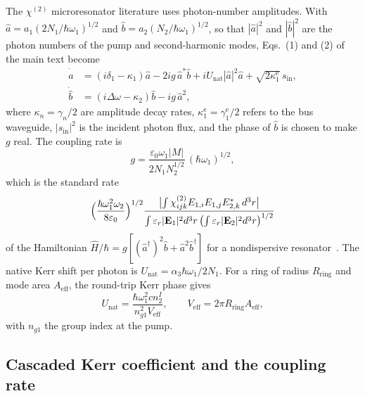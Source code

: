 \documentclass[9pt]{osa-supplemental-document}
\newcommand{\chitwo}{\chi^{(2)}}
\newcommand{\Dom}{\Delta\omega}
\begin{document}
The $\chitwo$ microresonator literature uses photon-number amplitudes.
With $\hat a=a_1(2N_1/\hbar\omega_1)^{1/2}$ and
$\hat b=a_2(N_2/\hbar\omega_1)^{1/2}$, so that $|\hat a|^2$ and
$|\hat b|^2$ are the photon numbers of the pump and second-harmonic modes,
Eqs.~(1) and (2) of the main text become
\begin{align}
  \dot{\hat a}&=(i\delta_1-\kappa_1)\hat a-2ig\,\hat a^*\hat b+iU_{\mathrm{nat}}|\hat a|^2\hat a+\sqrt{2\kappa_1^{\mathrm e}}\,s_{\mathrm{in}},
  \label{eq:ring-a}\\
  \dot{\hat b}&=(i\Dom-\kappa_2)\hat b-ig\,\hat a^2 ,
  \label{eq:ring-b}
\end{align}
where $\kappa_n=\gamma_n/2$ are amplitude decay rates, $\kappa_1^{\mathrm e}=\gamma_1^{\mathrm e}/2$
refers to the bus waveguide, $|s_{\mathrm{in}}|^2$ is the
incident photon flux, and the phase of $\hat b$ is chosen to make $g$ real.
The coupling rate is
\begin{equation}
  g=\frac{\varepsilon_0\omega_1|M|}{2N_1N_2^{1/2}}\,(\hbar\omega_1)^{1/2},
  \label{eq:g}
\end{equation}
which is the standard rate
\begin{equation*}
  \Bigl(\frac{\hbar\omega_1^2\omega_2}{8\varepsilon_0}\Bigr)^{1/2}
  \frac{\bigl|\int\chitwo_{ijk}E_{1,i}E_{1,j}E^*_{2,k}\,d^3r\bigr|}
       {\int\varepsilon_r|\mathbf E_1|^2d^3r\,\bigl(\int\varepsilon_r|\mathbf E_2|^2d^3r\bigr)^{1/2}}
\end{equation*}
of the Hamiltonian $\hat H/\hbar=g[(\hat a^\dagger)^2\hat b+\hat a^2\hat b^\dagger]$
for a nondispersive resonator~\cite{zhao2022,lu2020}.  The native Kerr
shift per photon is $U_{\mathrm{nat}}=\alpha_3\hbar\omega_1/2N_1$.  For a
ring of radius $R_{\mathrm{ring}}$ and mode area $A_{\mathrm{eff}}$, the
round-trip Kerr phase gives
\begin{equation}
  U_{\mathrm{nat}}=\frac{\hbar\omega_1^2cn_2^I}{n_{g1}^2V_{\mathrm{eff}}},\qquad
  V_{\mathrm{eff}}=2\pi R_{\mathrm{ring}}A_{\mathrm{eff}},
  \label{eq:Unat}
\end{equation}
with $n_{g1}$ the group index at the pump.

\subsection{Cascaded Kerr coefficient and the coupling rate}
\end{document}
